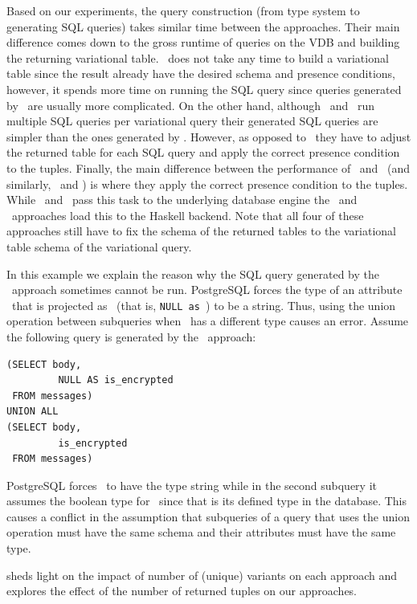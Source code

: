 %
Based on our experiments, the query construction (from type system to generating SQL queries) takes
similar time between the approaches. Their main difference comes down to the gross runtime
of queries on the VDB and building the returning variational table. 
%
\uav\ does not take any time to build a variational table since the result already have the
desired schema and presence conditions, however, it spends more time on running the 
SQL query since queries generated by \uav\ are usually more complicated. 
%
On the other hand, although \nbf\ and \ubf\ run multiple SQL queries per variational query
their generated SQL queries are simpler than the ones generated by \uav. However,
as opposed to \uav\ they have to adjust the returned table for each SQL query and apply
the correct presence condition to the tuples. 
%
Finally, the main difference between the performance of  \nbf\ and \nbfi\ (and similarly, \ubf\ and \ubfi)
is where they apply the correct presence condition to the tuples. While \nbfi\ and \ubfi\ pass this
task to the underlying database engine the \nbf\ and \ubf\ approaches load this to the Haskell 
backend. Note that all four of these approaches still have to fix the schema of the returned
tables to the variational table schema of the variational query. 

\begin{example}
\label{eg:uav-fail}
In this example we explain the reason why the SQL query generated by the \uav\ approach
sometimes cannot be run. PostgreSQL forces the type of an attribute \vAtt\ that is projected as \nul\
(that is, \texttt{NULL as \vAtt}) to be a string. Thus, using the union operation between 
subqueries when \vAtt\ has a different type causes an error. Assume the following query is 
generated by the \uav\ approach:
%
\begin{lstlisting}[basicstyle=\footnotesize\ttfamily,columns=flexible,lineskip=0.5\baselineskip]
(SELECT body,
         NULL AS is_encrypted
 FROM messages)
UNION ALL
(SELECT body,
         is_encrypted
 FROM messages)
\end{lstlisting}
%
PostgreSQL forces \isencrypted\ to have the type string while in the second subquery it assumes the boolean 
type for \isencrypted\ since that is its defined type in the  database. This causes a conflict in the assumption
that subqueries of a query that uses the union operation must have the same schema and their 
attributes must have the same type.
\end{example}

 sheds light on the impact of number of (unique) variants on each approach and
\secref{exp-tuples} explores the effect of the number of returned tuples on our approaches. 

